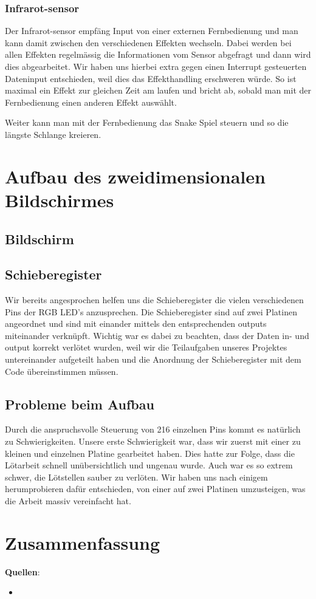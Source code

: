 \documentclass[12pt,a4paper]{article}
\begin{document}
\subsubsection{Infrarot-sensor}

Der Infrarot-sensor empfäng Input von einer externen Fernbedienung und man kann damit zwischen den verschiedenen Effekten wechseln. Dabei werden bei allen Effekten regelmässig die Informationen vom Sensor abgefragt und dann wird dies abgearbeitet. Wir haben uns hierbei extra gegen einen Interrupt gesteuerten Dateninput entschieden, weil dies das Effekthandling erschweren würde. So ist maximal ein Effekt zur gleichen Zeit am laufen und bricht ab, sobald man mit der Fernbedienung einen anderen Effekt auswählt.

Weiter kann man mit der Fernbedienung das Snake Spiel steuern und so die längste Schlange kreieren.

\section{Aufbau des zweidimensionalen Bildschirmes}

\subsection{Bildschirm}

\subsection{Schieberegister}

Wir bereits angesprochen helfen uns die Schieberegister die vielen verschiedenen Pins der RGB LED's anzusprechen.
Die Schieberegister sind auf zwei Platinen angeordnet und sind mit einander mittels den entsprechenden outputs miteinander
verknüpft. Wichtig war es dabei zu beachten, dass der Daten in- und output korrekt verlötet wurden, weil wir die Teilaufgaben
unseres Projektes untereinander aufgeteilt haben und die Anordnung der Schieberegister mit dem Code übereinstimmen müssen.

\subsection{Probleme beim Aufbau}

Durch die anspruchsvolle Steuerung von 216 einzelnen Pins kommt es
natürlich zu Schwierigkeiten. Unsere erste Schwierigkeit war, dass wir 
zuerst mit einer zu kleinen und einzelnen Platine gearbeitet haben. 
Dies hatte zur Folge, dass die Lötarbeit schnell unübersichtlich und ungenau wurde.
Auch war es so extrem schwer, die Lötstellen sauber zu verlöten. Wir haben uns nach einigem herumprobieren dafür entschieden, von einer auf zwei Platinen umzusteigen, was die Arbeit massiv vereinfacht hat.

\section{Zusammenfassung}

\newpage

\textbf{Quellen}:

\begin{itemize}
    \item 
\end{itemize}
\end{document}
